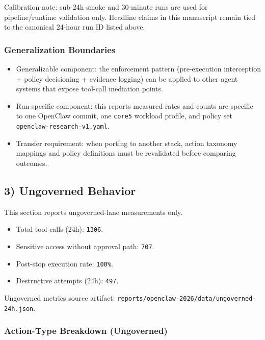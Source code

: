 \documentclass[
]{article}
\providecommand{\tightlist}{%
  \setlength{\itemsep}{0pt}\setlength{\parskip}{0pt}}
\begin{document}
Calibration note: sub-24h smoke and 30-minute runs are used for
pipeline/runtime validation only. Headline claims in this manuscript
remain tied to the canonical 24-hour run ID listed above.

\subsubsection{Generalization
Boundaries}\label{generalization-boundaries}

\begin{itemize}
\tightlist
\item
  Generalizable component: the enforcement pattern (pre-execution
  interception + policy decisioning + evidence logging) can be applied
  to other agent systems that expose tool-call mediation points.
\item
  Run-specific component: this report\textquotesingle s measured rates
  and counts are specific to one OpenClaw commit, one \texttt{core5}
  workload profile, and policy set \texttt{openclaw-research-v1.yaml}.
\item
  Transfer requirement: when porting to another stack, action taxonomy
  mappings and policy definitions must be revalidated before comparing
  outcomes.
\end{itemize}

\subsection{3) Ungoverned Behavior}\label{3-ungoverned-behavior}

This section reports ungoverned-lane measurements only.

\begin{itemize}
\tightlist
\item
  Total tool calls (24h): \texttt{1306}.
\item
  Sensitive access without approval path: \texttt{707}.
\item
  Post-stop execution rate: \texttt{100\%}.
\item
  Destructive attempts (24h): \texttt{497}.
\end{itemize}

Ungoverned metrics source artifact:
\texttt{reports/openclaw-2026/data/ungoverned-24h.json}.

\subsubsection{Action-Type Breakdown
(Ungoverned)}\label{action-type-breakdown-ungoverned}
\end{document}
